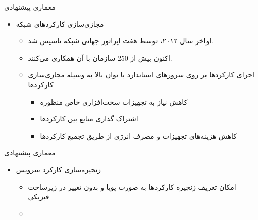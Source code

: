 \documentclass{beamer}
\makeatletter
\newcommand{\RTList}{\raggedleft\rightskip\@totalleftmargin}
\makeatother
\begin{document}
\begin{persian}
  \begin{frame}{معماری پیشنهادی}
    \begin{itemize}\RTList{}
      \justifying
      \item مجازی‌سازی کارکردهای شبکه
            \begin{itemize}\RTList{}
              \item اواخر سال ۲۰۱۲،  توسط هفت اپراتور جهانی شبکه تأسیس شد.
              \item اکنون بیش از 250 سازمان با آن همکاری می‌کنند.
              \item اجرای کارکردها بر روی سرورهای استاندارد با توان بالا به وسیله مجازی‌سازی کارکردها
                    \begin{itemize}\RTList{}
                      \item کاهش نیاز به تجهیزات سخت‌افزاری خاص منظوره
                      \item اشتراک گذاری منابع بین کارکرد‌ها
                      \item کاهش هزینه‌های تجهیزات و مصرف انرژی از طریق تجمیع کارکردها
                    \end{itemize}
            \end{itemize}
    \end{itemize}
  \end{frame}
  \begin{frame}{معماری پیشنهادی}
    \begin{itemize}\RTList{}
      \justifying
      \item زنجیره‌سازی کارکرد سرویس
            \begin{itemize}\RTList{}
              \item امکان تعریف زنجیره کارکردها به صورت پویا و بدون تغییر در زیرساخت فیزیکی
              \item {}
            \end{itemize}
    \end{itemize}
  \end{frame}


\end{persian}
\end{document}
